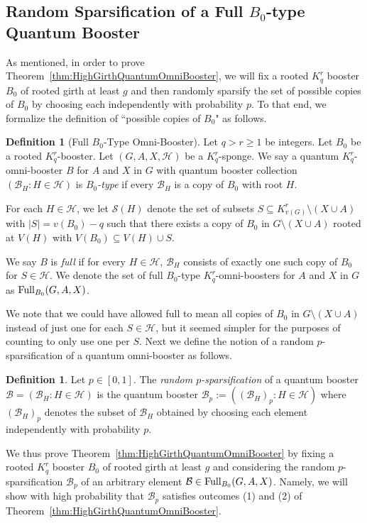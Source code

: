 \documentclass[11pt]{article}
\newcommand{\mc}[1]{\mathcal{#1}}
\newcounter{i}
\theoremstyle{plain}
\theoremstyle{plain} %
\theoremstyle{definition}
\newtheorem{definition}[thm]{Definition}
\begin{document}
\subsection{Random Sparsification of a Full $B_0$-type Quantum Booster}

As mentioned, in order to prove Theorem~\ref{thm:HighGirthQuantumOmniBooster}, we will fix a rooted $K_q^r$ booster $B_0$ of rooted girth at least $g$ and then randomly sparsify the set of possible copies of $B_0$ by choosing each independently with probability $p$. To that end, we formalize the definition of ``possible copies of $B_0$" as follows.

\begin{definition}[Full $B_0$-Type Omni-Booster]
Let $q > r\ge 1$ be integers. Let $B_0$ be a rooted $K_q^r$-booster. Let $(G,A,X,\mc{H})$ be a $K_q^r$-sponge. We say a quantum $K_q^r$-omni-booster $B$ for $A$ and $X$ in $G$ with quantum booster collection $(\mathcal{B}_H: H\in \mathcal{H})$ is \emph{$B_0$-type} if every $\mathcal{B}_H$ is a copy of $B_0$ with root $H$.


For each $H\in \mc{H}$, we let $\mc{S}(H)$ denote the set of subsets $S\subseteq K_{v(G)}^r\setminus (X\cup A)$ with $|S|=v(B_0)-q$ such that there exists a copy of $B_0$ in $G\setminus (X\cup A)$ rooted at $V(H)$ with $V(B_0)\subseteq V(H)\cup S$.

We say $B$ is \emph{full} if for every $H\in\mc{H}$, $\mc{B}_H$ consists of exactly one such copy of $B_0$ for $S\in \mc{H}$. We denote the set of full $B_0$-type $K_q^r$-omni-boosters for $A$ and $X$ in $G$ as ${\rm Full}_{B_0}(G,A,X)$.
\end{definition}

We note that we could have allowed full to mean all copies of $B_0$ in $G\setminus (X\cup A)$ instead of just one for each $S\in \mc{H}$, but it seemed simpler for the purposes of counting to only use one per $S$. Next we define the notion of a random $p$-sparsification of a quantum omni-booster as follows.

\begin{definition}
Let $p\in [0,1]$. The \emph{random $p$-sparsification} of a quantum booster $\mathcal{B} = (\mc{B}_H: H\in \mc{H})$ is the quantum booster $\mathcal{B}_p := ( (\mc{B}_H)_p: H\in \mc{H})$ where $(\mc{B}_H)_p$ denotes the subset of $\mc{B}_H$ obtained by choosing each element independently with probability $p$.   
\end{definition}

We thus prove Theorem~\ref{thm:HighGirthQuantumOmniBooster} by fixing a rooted $K_q^r$ booster $B_0$ of rooted girth at least $g$ and considering the random $p$-sparsification $\mc{B}_p$ of an arbitrary element $\mc{B}\in {\rm Full}_{B_0}(G,A,X)$. Namely, we will show with high probability that $\mc{B}_p$ satisfies outcomes (1) and (2) of Theorem~\ref{thm:HighGirthQuantumOmniBooster}.
\end{document}
